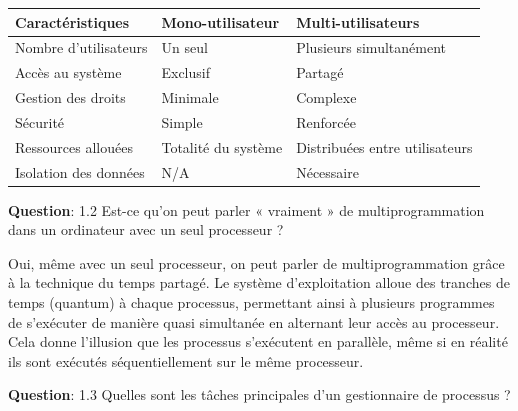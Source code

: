 \begin{center}
\setlength{\tabcolsep}{10pt}

\begin{tabular}{|p{}|p{}|p{}|}
\hline
\textbf{Caractéristiques} & \textbf{Mono-utilisateur} & \textbf{Multi-utilisateurs} \\ \hline

Nombre d'utilisateurs & Un seul & Plusieurs simultanément \\ \hline

Accès au système & Exclusif & Partagé \\ \hline

Gestion des droits & Minimale & Complexe \\ \hline

Sécurité & Simple & Renforcée \\ \hline

Ressources allouées & Totalité du système & Distribuées entre utilisateurs \\ \hline

Isolation des données & N/A & Nécessaire \\ \hline

\end{tabular}
\end{center}

\vspace{0.5cm}

\noindent \textbf{Question}: 1.2 Est-ce qu'on peut parler « vraiment » de multiprogrammation dans un ordinateur avec un seul processeur ?

\noindent Oui, même avec un seul processeur, on peut parler de multiprogrammation grâce à la technique du temps partagé. Le système d'exploitation alloue des tranches de temps (quantum) à chaque processus, permettant ainsi à plusieurs programmes de s'exécuter de manière quasi simultanée en alternant leur accès au processeur. Cela donne l'illusion que les processus s'exécutent en parallèle, même si en réalité ils sont exécutés séquentiellement sur le même processeur.

\vspace{0.5cm}

\noindent \textbf{Question}: 1.3 Quelles sont les tâches principales d'un gestionnaire de processus ?

